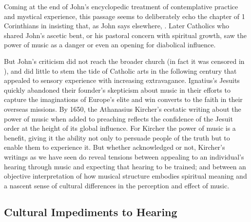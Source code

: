 Coming at the end of John's encyclopedic treatment of contemplative practice and
mystical experience, this passage seems to deliberately echo the 
chapter of 1 Corinthians in insisting that, as John says elsewhere, .%
    \Autocite
    [, , ]
    {JuandelaCruz:Subida}
Later Catholics who shared John's ascetic bent, or his pastoral concern with
spiritual growth, saw the power of music as a danger or even an opening for
diabolical influence.

But John's criticism did not reach the broader church (in fact it was censored
in ), and did little to stem the tide of Catholic arts in the
following century that appealed to sensory experience with increasing
extravagance.
Ignatius's Jesuits quickly abandoned their founder's skepticism about music in
their efforts to capture the imaginations of Europe's elite and win converts to
the faith in their overseas missions.
By 1650, the Athanasius Kircher's ecstatic writing about the power of
music when added to preaching reflects the confidence of the Jesuit order
at the height of its global influence.
For Kircher the power of music is a benefit, giving it the ability not only to
persuade people of the truth but to enable them to experience it.
But whether acknowledged or not, Kircher's writings as we have seen do reveal
tensions between appealing to an individual's hearing through music and
expecting that hearing to be trained; and between an objective interpretation
of how musical structure embodies spiritual meaning and a nascent sense of
cultural differences in the perception and effect of music.

\subsection{Cultural Impediments to Hearing}

